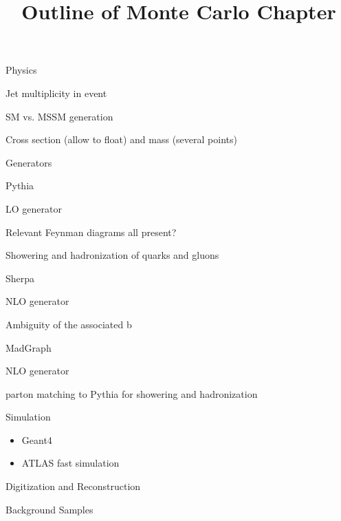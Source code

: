 \documentclass[11pt]{report}
\title{Outline of Monte Carlo Chapter}
\begin{document}
\begin{outline}
	\item Physics
		\begin{outline}
			\item Jet multiplicity in event
			\item SM vs. MSSM generation
			\item Cross section (allow to float) and mass (several points)
		\end{outline}
	\item Generators
		\begin{outline}
			\item Pythia
				\begin{outline}
					\item LO generator
					\item Relevant Feynman diagrams all present?
					\item Showering and hadronization of quarks and gluons
				\end{outline}
			\item Sherpa
				\begin{outline}
					\item NLO generator
					\item Ambiguity of the associated b
				\end{outline}
			\item MadGraph
				\begin{outline}
					\item NLO generator
					\item parton matching to Pythia for showering and hadronization
				\end{outline}
		\end{outline}
	\item Simulation
		\begin{itemize}
			\item Geant4
			\item ATLAS fast simulation %
		\end{itemize}
	\item Digitization and Reconstruction
	\item Background Samples

\end{outline}
\end{document}
